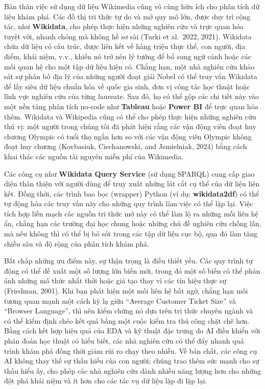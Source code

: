 Bản thân việc sử dụng dữ liệu Wikimedia cũng vô cùng hữu ích cho phân tích dữ liệu khám phá. Các đồ thị tri thức tự do và mở quy mô lớn, được duy trì cộng tác, như \textbf{Wikidata}, cho phép thực hiện những nghiên cứu và trực quan hóa tuyệt vời, nhanh chóng mà không hề sơ sài (Turki et al.~2022, 2021). Wikidata chứa dữ liệu có cấu trúc, được liên kết về hàng triệu thực thể, con người, địa điểm, khái niệm, v.v., khiến nó trở nên lý tưởng để bổ sung ngữ cảnh hoặc các mối quan hệ cho một tập dữ liệu hiện có. Chẳng hạn, một nhà nghiên cứu khảo sát sự phân bố địa lý của những người đoạt giải Nobel có thể truy vấn Wikidata để lấy siêu dữ liệu chuẩn hóa về quốc gia sinh, đơn vị công tác học thuật hoặc lĩnh vực nghiên cứu của từng laureate. Sau đó, họ có thể gộp các chi tiết này vào một nền tảng phân tích no-code như \textbf{Tableau} hoặc \textbf{Power BI} để trực quan hóa thêm. Wikidata và Wikipedia cũng có thể cho phép thực hiện những nghiên cứu thú vị: một người trong chúng tôi đã phát hiện rằng các vận động viên đoạt huy chương Olympic có tuổi thọ ngắn hơn so với các vận động viên Olympic không đoạt huy chương (Kovbasiuk, Ciechanowski, and Jemielniak, 2024) bằng cách khai thác các nguồn tài nguyên miễn phí của Wikimedia.

Các công cụ như \textbf{Wikidata Query Service} (sử dụng SPARQL) cung cấp giao diện thân thiện với người dùng để truy xuất những lát cắt cụ thể của dữ liệu liên kết. Đồng thời, các trình bao bọc (wrapper) Python (ví dụ: \textbf{wikidata2df}) có thể tự động hóa các truy vấn này cho những quy trình làm việc có thể lặp lại. Việc tích hợp liền mạch các nguồn tri thức mở này có thể làm lộ ra những mối liên hệ ẩn, chẳng hạn các trường đại học chung hoặc những chủ đề nghiên cứu chồng lấn, mà nếu không thì có thể bị bỏ sót trong các tập dữ liệu cục bộ, qua đó làm tăng chiều sâu và độ rộng của phân tích khám phá.

Bất chấp những ưu điểm này, sự thận trọng là điều thiết yếu. Các quy trình tự động có thể đề xuất một số lượng lớn biến mới, trong đó một số biến có thể phản ánh những mô thức nhất thời hoặc giả tạo thay vì các tín hiệu thực sự (Friedman, 2001). Khi bạn phát hiện một mối liên hệ bất ngờ, chẳng hạn mối tương quan mạnh một cách kỳ lạ giữa ``Average Customer Ticket Size'' và ``Browser Language'', thì nên kiểm chứng nó dựa trên tri thức chuyên ngành và có thể kiểm định chéo kết quả bằng một cuộc kiểm tra thủ công chặt chẽ hơn. Bằng cách kết hợp hiệu quả của EDA và kỹ thuật đặc trưng do AI điều khiển với phán đoán học thuật có hiểu biết, các nhà nghiên cứu có thể đẩy nhanh quá trình khám phá đồng thời giảm rủi ro chạy theo nhiễu. Về bản chất, các công cụ AI không thay thế sự thấu hiểu của con người; chúng trao thêm sức mạnh cho sự thấu hiểu ấy, cho phép các nhà nghiên cứu dành nhiều năng lượng hơn cho những đột phá khái niệm và ít hơn cho các tác vụ dữ liệu lặp đi lặp lại.

